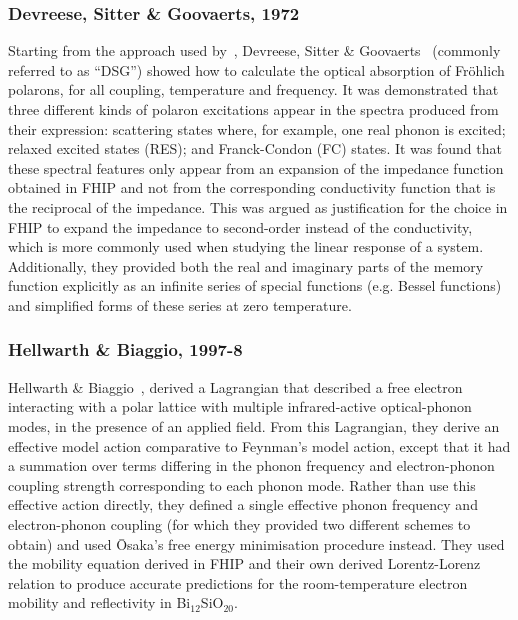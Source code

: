 \subsubsection{Devreese, Sitter \& Goovaerts, 1972}
\label{subsubsec:2-1-1-6}

Starting from the approach used by~\cite{feynman_mobility_1962}, Devreese, Sitter \& Goovaerts~\cite{devreese_optical_1972} (commonly referred to as ``DSG'') showed how to calculate the optical absorption of Fr\"ohlich polarons, for all coupling, temperature and frequency. It was demonstrated that three different kinds of polaron excitations appear in the spectra produced from their expression: scattering states where, for example, one real phonon is excited; relaxed excited states (RES); and Franck-Condon (FC) states. It was found that these spectral features only appear from an expansion of the impedance function obtained in FHIP and not from the corresponding conductivity function that is the reciprocal of the impedance. This was argued as justification for the choice in FHIP to expand the impedance to second-order instead of the conductivity, which is more commonly used when studying the linear response of a system. Additionally, they provided both the real and imaginary parts of the memory function explicitly as an infinite series of special functions (e.g. Bessel functions) and simplified forms of these series at zero temperature.

\subsubsection{Hellwarth \& Biaggio, 1997-8}
\label{subsubsec:2-1-1-7}

Hellwarth \& Biaggio~\cite{hellwarth_mobility_1999}, derived a Lagrangian that described a free electron interacting with a polar lattice with multiple infrared-active optical-phonon modes, in the presence of an applied field. From this Lagrangian, they derive an effective model action comparative to Feynman's model action, except that it had a summation over terms differing in the phonon frequency and electron-phonon coupling strength corresponding to each phonon mode. Rather than use this effective action directly, they defined a single effective phonon frequency and electron-phonon coupling (for which they provided two different schemes to obtain) and used \=Osaka's free energy minimisation procedure instead. They used the mobility equation derived in FHIP and their own derived Lorentz-Lorenz relation to produce accurate predictions for the room-temperature electron mobility and reflectivity in Bi$_{12}$SiO$_{20}$.

